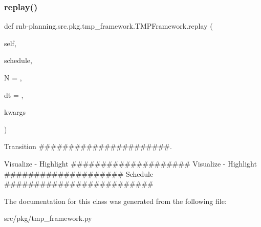 \subsubsection{\texorpdfstring{replay()}{replay()}}
{\footnotesize\ttfamily def rnb-\/planning.\+src.\+pkg.\+tmp\+\_\+framework.\+T\+M\+P\+Framework.\+replay (\begin{DoxyParamCaption}\item[{}]{self,  }\item[{}]{schedule,  }\item[{}]{N = {},  }\item[{}]{dt = {},  }\item[{}]{kwargs }\end{DoxyParamCaption})}



Transition \#\#\#\#\#\#\#\#\#\#\#\#\#\#\#\#\#\#\#\#\#\#. 

Visualize -\/ Highlight \#\#\#\#\#\#\#\#\#\#\#\#\#\#\#\#\#\#\#\# Visualize -\/ Highlight \#\#\#\#\#\#\#\#\#\#\#\#\#\#\#\#\#\#\#\# Schedule \#\#\#\#\#\#\#\#\#\#\#\#\#\#\#\#\#\#\#\#\#\#\#\#\# 

The documentation for this class was generated from the following file\+:\begin{DoxyCompactItemize}
\item 
src/pkg/tmp\+\_\+framework.\+py\end{DoxyCompactItemize}
